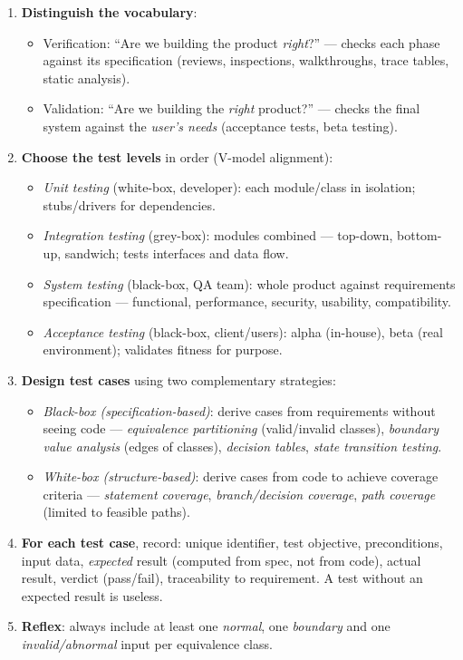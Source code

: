 \documentclass[11pt]{article}
\newcommand{\cle}[1]{{\popxbold\color{popdark}#1}}
\begin{document}
\begin{methode}
\begin{enumerate}
\item \textbf{Distinguish the vocabulary}:
\begin{itemize}
\item \cle{Verification}: ``Are we building the product \emph{right}?'' — checks each phase against its specification (reviews, inspections, walkthroughs, trace tables, static analysis).
\item \cle{Validation}: ``Are we building the \emph{right} product?'' — checks the final system against the \emph{user's needs} (acceptance tests, beta testing).
\end{itemize}
\item \textbf{Choose the test levels} in order (V-model alignment):
\begin{itemize}
\item \emph{Unit testing} (white-box, developer): each module/class in isolation; stubs/drivers for dependencies.
\item \emph{Integration testing} (grey-box): modules combined — top-down, bottom-up, sandwich; tests interfaces and data flow.
\item \emph{System testing} (black-box, QA team): whole product against requirements specification — functional, performance, security, usability, compatibility.
\item \emph{Acceptance testing} (black-box, client/users): alpha (in-house), beta (real environment); validates fitness for purpose.
\end{itemize}
\item \textbf{Design test cases} using two complementary strategies:
\begin{itemize}
\item \emph{Black-box (specification-based)}: derive cases from requirements without seeing code — \emph{equivalence partitioning} (valid/invalid classes), \emph{boundary value analysis} (edges of classes), \emph{decision tables}, \emph{state transition testing}.
\item \emph{White-box (structure-based)}: derive cases from code to achieve coverage criteria — \emph{statement coverage}, \emph{branch/decision coverage}, \emph{path coverage} (limited to feasible paths).
\end{itemize}
\item \textbf{For each test case}, record: unique identifier, test objective, preconditions, input data, \emph{expected} result (computed from spec, not from code), actual result, verdict (pass/fail), traceability to requirement. A test without an expected result is useless.
\item \textbf{Reflex}: always include at least one \emph{normal}, one \emph{boundary} and one \emph{invalid/abnormal} input per equivalence class.
\end{enumerate}
\end{methode}
\end{document}
